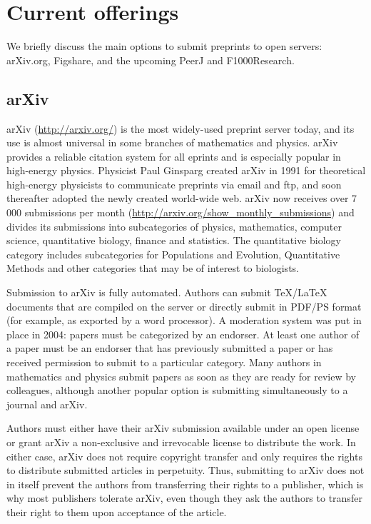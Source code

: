 \documentclass[letterpaper,twocolumn,superscriptaddress,showkeys]{revtex4-1}
\begin{document}
\section{Current offerings}

We briefly discuss the main options to submit preprints to open servers:
arXiv.org, Figshare, and the upcoming PeerJ and F1000Research.

\subsection{arXiv}

arXiv (\url{http://arxiv.org/}) is the most widely-used preprint server today,
and its use is almost universal in some branches of mathematics and physics.
arXiv provides a reliable citation system for all eprints and is especially
popular in high-energy physics. Physicist Paul Ginsparg created arXiv in 1991
for theoretical high-energy physicists to communicate preprints via email and
ftp, and soon thereafter adopted the newly created world-wide
web\cite{jackson2002preprints}.  arXiv now receives over 7 000 submissions per
month (\url{http://arxiv.org/show_monthly_submissions}) and divides its
submissions into subcategories of physics, mathematics, computer science,
quantitative biology, finance and statistics.  The quantitative biology category
includes subcategories for Populations and Evolution, Quantitative Methods and
other categories that may be of interest to biologists.

Submission to arXiv is fully automated.  Authors can submit \TeX{}/\LaTeX{}
documents that are compiled on the server or directly submit in PDF/PS format
(for example, as exported by a word processor).  A moderation system was put in
place in 2004: papers must be categorized by an endorser. At least one author of
a paper must be an endorser that has previously submitted a paper or has
received permission to submit to a particular category.  Many authors in
mathematics and physics submit papers as soon as they are ready for review by
colleagues, although another popular option is submitting simultaneously to a
journal and arXiv.

Authors must either have their arXiv submission available under an open license
or grant arXiv a non-exclusive and irrevocable license to distribute the work.
In either case, arXiv does not require copyright transfer and only requires the
rights to distribute submitted articles in perpetuity. Thus, submitting to arXiv
does not in itself prevent the authors from transferring their rights to a
publisher, which is why most publishers tolerate arXiv, even though they ask the
authors to transfer their right to them upon acceptance of the article.
\end{document}
